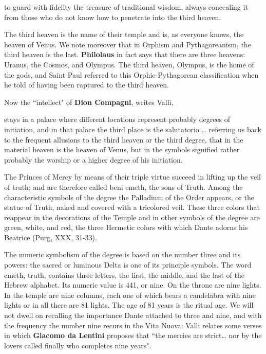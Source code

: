\begin{quotex}
to guard with fidelity the treasure of traditional wisdom, always concealing it from those who do not know how to penetrate into the third heaven.

\end{quotex}
The third heaven is the name of their temple and is, as everyone knows, the heaven of Venus. We note moreover that in Orphism and Pythagoreanism, the third heaven is the last. \textbf{Philolaus} in fact says that there are three heavens: Uranus, the Cosmos, and Olympus. The third heaven, Olympus, is the home of the gods, and Saint Paul referred to this Orphic-Pythagorean classification when he told of having been raptured to the third heaven.

Now the ``intellect" of \textbf{Dion Compagni}, writes Valli,

\begin{quotex}
stays in a palace where different locations represent probably degrees of initiation, and in that palace the third place is the salutatorio … referring us back to the frequent allusions to the third heaven or the third degree, that in the material heaven is the heaven of Venus, but in the symbols signified rather probably the worship or a higher degree of his initiation.

\end{quotex}
The Princes of Mercy by means of their triple virtue succeed in lifting up the veil of truth; and are therefore called beni emeth, the sons of Truth. Among the characteristic symbols of the degree the Palladium of the Order appears, or the statue of Truth, naked and covered with a tricolored veil. These three colors that reappear in the decorations of the Temple and in other symbols of the degree are green, white, and red, the three Hermetic colors with which Dante adorns his Beatrice (Purg, XXX, 31-33).

The numeric symbolism of the degree is based on the number three and its powers: the sacred or luminous Delta is one of its principle symbols. The word emeth, truth, contains three letters, the first, the middle, and the last of the Hebrew alphabet. Its numeric value is 441, or nine. On the throne are nine lights. In the temple are nine columns, each one of which bears a candelabra with nine lights or in all there are 81 lights. The age of 81 years is the ritual age. We will not dwell on recalling the importance Dante attached to three and nine, and with the frequency the number nine recurs in the Vita Nuova: Valli relates some verses in which \textbf{Giacomo da Lentini} proposes that ``the mercies are strict… nor by the lovers called finally who completes nine years".

